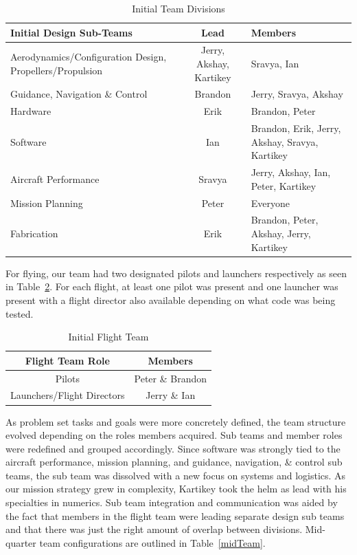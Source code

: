 \documentclass[11pt]{article}
\begin{document}
		\begin{table}[!ht]
			\begin{center}
				\begin{tabular}{| p{7.5cm} | c | p{3.7cm} |}
					\hline
					\textbf{Initial Design Sub-Teams} & \textbf{Lead} & \textbf{Members} \\ \hline
					Aerodynamics/Configuration Design, Propellers/Propulsion & Jerry, Akshay, Kartikey & Sravya, Ian \\ \hline
					Guidance, Navigation \& Control & Brandon & Jerry, Sravya, Akshay \\ \hline
					Hardware & Erik & Brandon, Peter \\ \hline
					Software & Ian & Brandon, Erik, Jerry, Akshay, Sravya, Kartikey \\ \hline
					Aircraft Performance & Sravya & Jerry, Akshay, Ian, Peter, Kartikey \\ \hline
					Mission Planning & Peter & Everyone \\ \hline
					Fabrication & Erik & Brandon, Peter, Akshay, Jerry, Kartikey \\ \hline
				\end{tabular}
				\caption{Initial Team Divisions}
				\label{initTeam}
			\end{center}
		\end{table}

		For flying, our team had two designated pilots and launchers respectively as seen in Table~\ref{initFltTeam}. For each flight, at least one pilot was present and one launcher was present with a flight director also available depending on what code was being tested.

		\begin{table}[!ht]
			\begin{center}
				\begin{tabular}{| c | c |}
					\hline
					\textbf{Flight Team Role} & \textbf{Members} \\ \hline
					Pilots & Peter \& Brandon \\ \hline
					Launchers/Flight Directors & Jerry \& Ian \\ \hline
				\end{tabular}
				\caption{Initial Flight Team}
				\label{initFltTeam}
			\end{center}
		\end{table}

		As problem set tasks and goals were more concretely defined, the team structure evolved depending on the roles members acquired. Sub teams and member roles were redefined and grouped accordingly. Since software was strongly tied to the aircraft performance, mission planning, and guidance, navigation, \& control sub teams, the sub team was dissolved with a new focus on systems and logistics. As our mission strategy grew in complexity, Kartikey took the helm as lead with his specialties in numerics. Sub team integration and communication was aided by the fact that members in the flight team were leading separate design sub teams and that there was just the right amount of overlap between divisions. Mid-quarter team configurations are outlined in Table~\ref{midTeam}.
\end{document}
